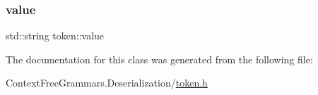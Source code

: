 \mbox{\label{classtoken_aebc1e280e783cda819ca694efcbeb59a}} 
\subsubsection{\texorpdfstring{value}{value}}
{\footnotesize\ttfamily std\+::string token\+::value}



The documentation for this class was generated from the following file\+:\begin{DoxyCompactItemize}
\item 
Context\+Free\+Grammars.\+Deserialization/\mbox{\hyperlink{token_8h}{token.\+h}}\end{DoxyCompactItemize}
